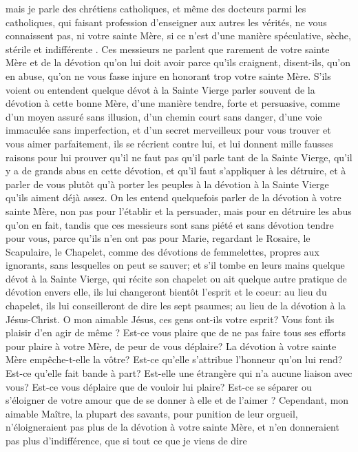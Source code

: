 mais je parle des chrétiens catholiques, et même des docteurs parmi les catholiques, qui faisant profession
d'enseigner aux autres les vérités, ne vous connaissent pas, ni votre sainte Mère, si ce n'est d'une manière
spéculative, sèche, stérile et indifférente . Ces messieurs ne parlent que rarement de votre sainte Mère et de la
dévotion qu'on lui doit avoir parce qu'ils craignent, disent-ils, qu'on en abuse, qu'on ne vous fasse injure en
honorant trop votre sainte Mère. S'ils voient ou entendent quelque dévot à la Sainte Vierge parler souvent de la
dévotion à cette bonne Mère, d'une manière tendre, forte et persuasive, comme d'un moyen assuré sans illusion,
d'un chemin court sans danger, d'une voie immaculée sans imperfection, et d'un secret merveilleux pour vous
trouver et vous aimer parfaitement, ils se récrient contre lui, et lui donnent mille fausses raisons pour lui prouver
qu'il ne faut pas qu'il parle tant de la Sainte Vierge, qu'il y a de grands abus en cette dévotion, et qu'il faut
s'appliquer à les détruire, et à parler de vous plutôt qu'à porter les peuples à la dévotion à la Sainte Vierge qu'ils
aiment déjà assez.
On les entend quelquefois parler de la dévotion à votre sainte Mère, non pas pour l'établir et la persuader, mais
pour en détruire les abus qu'on en fait, tandis que ces messieurs sont sans piété et sans dévotion tendre pour
vous, parce qu'ils n'en ont pas pour Marie, regardant le Rosaire, le Scapulaire, le Chapelet, comme des dévotions
de femmelettes, propres aux ignorants, sans lesquelles on peut se sauver; et s'il tombe en leurs mains quelque
dévot à la Sainte Vierge, qui récite son chapelet ou ait quelque autre pratique de dévotion envers elle, ils lui
changeront bientôt l'esprit et le coeur: au lieu du chapelet, ils lui conseilleront de dire les sept psaumes; au lieu de
la dévotion à la Jésus-Christ.
O mon aimable Jésus, ces gens ont-ils votre esprit? Vous font ils plaisir d'en agir de même ? Est-ce vous plaire
que de ne pas faire tous ses efforts pour plaire à votre Mère, de peur de vous déplaire? La dévotion à votre sainte
Mère empêche-t-elle la vôtre? Est-ce qu'elle s'attribue l'honneur qu'on lui rend? Est-ce qu'elle fait bande à part?
Est-elle une étrangère qui n'a aucune liaison avec vous? Est-ce vous déplaire que de vouloir lui plaire? Est-ce se
séparer ou s'éloigner de votre amour que de se donner à elle et de l'aimer ?
 Cependant, mon aimable Maître, la plupart des savants, pour punition de leur orgueil, n'éloigneraient pas plus
de la dévotion à votre sainte Mère, et n'en donneraient pas plus d'indifférence, que si tout ce que je viens de dire
